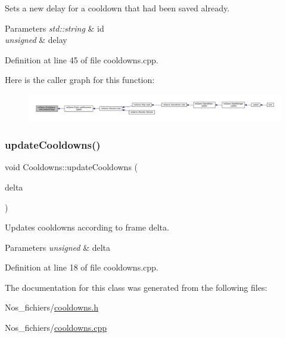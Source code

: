 Sets a new delay for a cooldown that had been saved already. 


\begin{DoxyParams}{Parameters}
{\em std\+::string} & id \\
\hline
{\em unsigned} & delay \\
\hline
\end{DoxyParams}


Definition at line 45 of file cooldowns.\+cpp.

Here is the caller graph for this function\+:\nopagebreak
\begin{figure}[H]
\begin{center}
\leavevmode
\includegraphics[width=350pt]{classns_game_1_1_cooldowns_a0db5b81efac93aacc0b12b2aa520620b_icgraph}
\end{center}
\end{figure}
\mbox{\label{classns_game_1_1_cooldowns_a35012d31be60c3743363d0487f2cead9}} 
\subsubsection{\texorpdfstring{update\+Cooldowns()}{updateCooldowns()}}
{\footnotesize\ttfamily void Cooldowns\+::update\+Cooldowns (\begin{DoxyParamCaption}\item[{unsigned}]{delta }\end{DoxyParamCaption})\hspace{0.3cm}{\ttfamily [static]}}



Updates cooldowns according to frame delta. 


\begin{DoxyParams}{Parameters}
{\em unsigned} & delta \\
\hline
\end{DoxyParams}


Definition at line 18 of file cooldowns.\+cpp.



The documentation for this class was generated from the following files\+:\begin{DoxyCompactItemize}
\item 
Nos\+\_\+fichiers/\hyperlink{cooldowns_8h}{cooldowns.\+h}\item 
Nos\+\_\+fichiers/\hyperlink{cooldowns_8cpp}{cooldowns.\+cpp}\end{DoxyCompactItemize}
